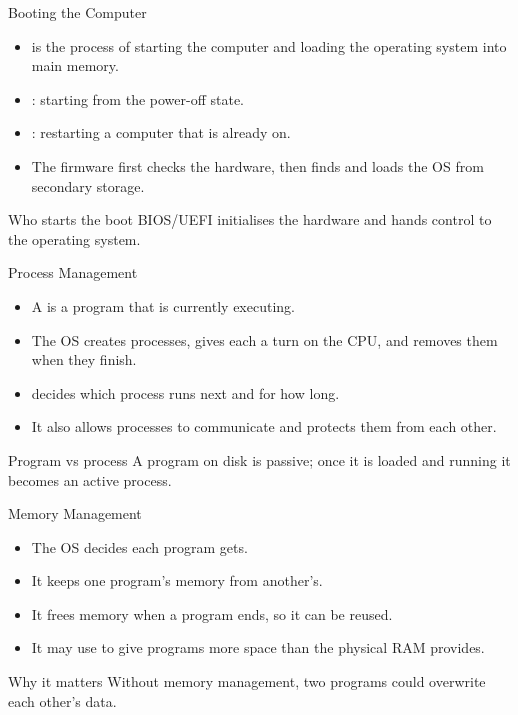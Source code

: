 \documentclass[aspectratio=169]{beamer}
\begin{document}
\begin{frame}{Booting the Computer}
  \begin{itemize}
    \item {} is the process of starting the computer and loading
      the operating system into main memory.
    \item {}: starting from the power-off state.
    \item {}: restarting a computer that is already on.
    \item The firmware  first checks the hardware, then finds
      and loads the OS from secondary storage.
  \end{itemize}
  \begin{block}{Who starts the boot}
    BIOS/UEFI initialises the hardware and hands control to the operating
    system.
  \end{block}
\end{frame}

\begin{frame}{Process Management}
  \begin{itemize}
    \item A  is a program that is currently executing.
    \item The OS creates processes, gives each a turn on the CPU, and removes
      them when they finish.
    \item {} decides which process runs next and for how
      long.
    \item It also allows processes to communicate and protects them from each
      other.
  \end{itemize}
  \begin{block}{Program vs process}
    A program on disk is passive; once it is loaded and running it becomes an
    active process.
  \end{block}
\end{frame}

\begin{frame}{Memory Management}
  \begin{itemize}
    \item The OS decides  each program gets.
    \item It keeps one program's memory  from another's.
    \item It frees memory when a program ends, so it can be reused.
    \item It may use  to give programs more space than the
      physical RAM provides.
  \end{itemize}
  \begin{block}{Why it matters}
    Without memory management, two programs could overwrite each other's data.
  \end{block}
\end{frame}
\end{document}
